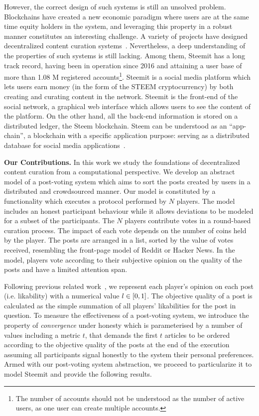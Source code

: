    However, the correct design of such systems is still an unsolved problem. Blockchains have created a new economic paradigm where users are at the same time equity holders in the system, and leveraging this property in a robust manner constitutes an interesting challenge.
   A variety of projects have designed decentralized content curation systems~\cite{synereo,steemit,tcr}. Nevertheless, a deep understanding of the properties of such systems is still lacking. Among them, Steemit
has a long track record, having been in operation since 2016 and attaining a user base of more than 1.08 M registered accounts\footnote{The number of accounts should not be understood as the number of active users, as one user can create multiple accounts.}. Steemit is a social media platform which lets users earn money (in the form of the STEEM cryptocurrency) by both creating and curating content in the network. Steemit is the front-end of the social network, a graphical web interface which allows users to see the content of the platform. On the other hand, all the back-end information is stored on a distributed ledger, the Steem blockchain. Steem can be understood as an ``app-chain'', a blockchain with a specific application purpose: serving as a distributed database for social media applications~\cite{steemit}.

\noindent  \textbf{Our Contributions.}
In this work we study the foundations of decentralized content curation from a computational perspective. We develop an abstract model of a post-voting system which aims to sort the posts created by users in a distributed and crowdsourced manner.
  Our model is constituted by a functionality which executes a protocol performed by $N$ players. The model includes an honest participant behaviour while it allows deviations to be modeled for a subset of the participants.      The $N$ players contribute votes in a round-based curation process. The impact of each vote depends on the number of coins held by the player.
   The posts are arranged in a list, sorted by the value of votes received, resembling the front-page model of Reddit or Hacker News. In the model, players vote according to their subjective opinion on the quality of the posts and have a limited attention span.

   Following previous related work~\cite{ghosh2011incentivizing,askalidis2013theoretical}, we represent each player's opinion on each post (i.e. likability) with a numerical value $l \in [ 0,1 ]$.
   The objective quality of a post is calculated as the simple summation of all players' likabilities for the post in question. 
   To measure the effectiveness of a post-voting system, we introduce the property of  \textit{convergence} under honesty which is parameterised by a number of values including a metric $t$, that demands the  first $t$ articles to be   ordered according to the objective quality of the posts at the end of the execution assuming all participants signal honestly to the system their personal preferences. 
Armed with our  post-voting system abstraction, we proceed to particularize it to model Steemit and provide the following results. 

